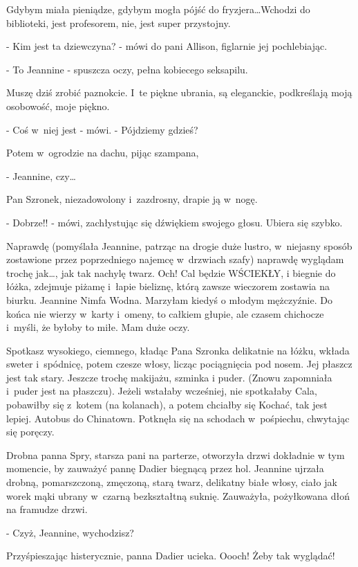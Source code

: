 \documentclass[oneside,polish,12pt,sfheadings]{mwbk}
\begin{document}
Gdybym miała pieniądze, gdybym mogła pójść do fryzjera\ldots Wchodzi
do biblioteki, jest profesorem, nie, jest super przystojny. 

- Kim jest ta dziewczyna? - mówi do pani Allison, figlarnie jej pochlebiając. 

- To Jeannine - spuszcza oczy,
pełna kobiecego seksapilu. 

Muszę dziś zrobić paznokcie. I~te piękne
ubrania, są eleganckie, podkreślają moją osobowość, moje piękno. 

- Coś w~niej jest - mówi. - Pójdziemy gdzieś? 

Potem w~ogrodzie na dachu, pijąc szampana, 

- Jeannine, czy\ldots

Pan Szronek, niezadowolony i~zazdrosny, drapie ją w~nogę. 

- Dobrze!! - mówi, zachłystując się dźwiękiem swojego głosu. Ubiera się szybko.

Naprawdę (pomyślała Jeannine, patrząc na drogie duże lustro, w~niejasny
sposób zostawione przez poprzedniego najemcę w~drzwiach szafy) naprawdę
wyglądam trochę jak\ldots, jak tak nachylę twarz. Och! Cal będzie WŚCIEKŁY,
i biegnie do łóżka, zdejmuje piżamę i~łapie bieliznę, którą zawsze
wieczorem zostawia na biurku. Jeannine Nimfa Wodna. Marzyłam kiedyś
o młodym mężczyźnie. Do końca nie wierzy w~karty i~omeny, to całkiem
głupie, ale czasem chichocze i~myśli, że byłoby to miłe. Mam duże
oczy.

Spotkasz wysokiego, ciemnego, kładąc Pana Szronka delikatnie na łóżku,
wkłada sweter i~spódnicę, potem czesze włosy, licząc pociągnięcia
pod nosem. Jej płaszcz jest tak stary. Jeszcze trochę makijażu, szminka
i puder. (Znowu zapomniała i~puder jest na płaszczu). Jeżeli wstałaby
wcześniej, nie spotkałaby Cala, pobawiłby się z~kotem (na kolanach),
a potem chciałby się Kochać, tak jest lepiej. Autobus do Chinatown.
Potknęła się na schodach w~pośpiechu, chwytając się poręczy.

Drobna panna Spry, starsza pani na parterze, otworzyła drzwi dokładnie
w tym momencie, by zauważyć pannę Dadier biegnącą przez hol. Jeannine
ujrzała drobną, pomarszczoną, zmęczoną, starą twarz, delikatny białe
włosy, ciało jak worek mąki ubrany w~czarną bezkształtną suknię. Zauważyła,
pożyłkowana dłoń na framudze drzwi.

- Czyż, Jeannine, wychodzisz?

Przyśpieszając histerycznie, panna Dadier ucieka. Oooch! Żeby tak
wyglądać!
\end{document}
